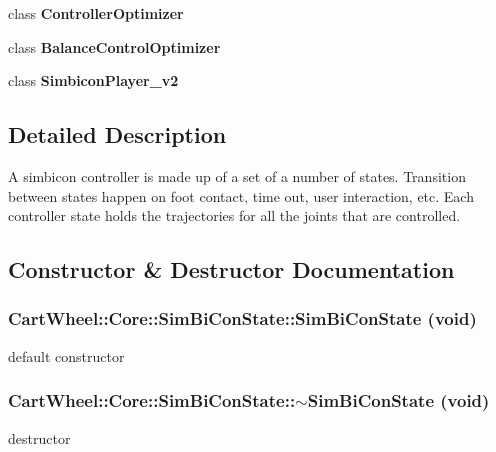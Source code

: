 \begin{DoxyCompactItemize}
\item 
\hypertarget{classCartWheel_1_1Core_1_1SimBiConState_ae8da284839040b40a9832401721dd043}{
class {\bfseries ControllerOptimizer}}
\label{classCartWheel_1_1Core_1_1SimBiConState_ae8da284839040b40a9832401721dd043}

\item 
\hypertarget{classCartWheel_1_1Core_1_1SimBiConState_a39464b3020a0cf52399c03300b8fd076}{
class {\bfseries BalanceControlOptimizer}}
\label{classCartWheel_1_1Core_1_1SimBiConState_a39464b3020a0cf52399c03300b8fd076}

\item 
\hypertarget{classCartWheel_1_1Core_1_1SimBiConState_a29b34775f8ee85729748375472b56b46}{
class {\bfseries SimbiconPlayer\_\-v2}}
\label{classCartWheel_1_1Core_1_1SimBiConState_a29b34775f8ee85729748375472b56b46}

\end{DoxyCompactItemize}


\subsection{Detailed Description}
A simbicon controller is made up of a set of a number of states. Transition between states happen on foot contact, time out, user interaction, etc. Each controller state holds the trajectories for all the joints that are controlled. 

\subsection{Constructor \& Destructor Documentation}
\hypertarget{classCartWheel_1_1Core_1_1SimBiConState_a5201e6401e9c53067b5fedaa2a457431}{
\subsubsection[{SimBiConState}]{\setlength{\rightskip}{0pt plus 5cm}CartWheel::Core::SimBiConState::SimBiConState (void)}}
\label{classCartWheel_1_1Core_1_1SimBiConState_a5201e6401e9c53067b5fedaa2a457431}
default constructor \hypertarget{classCartWheel_1_1Core_1_1SimBiConState_a4917b8eb30d919c48ff57526e8d9c3e1}{
\subsubsection[{$\sim$SimBiConState}]{\setlength{\rightskip}{0pt plus 5cm}CartWheel::Core::SimBiConState::$\sim$SimBiConState (void)}}
\label{classCartWheel_1_1Core_1_1SimBiConState_a4917b8eb30d919c48ff57526e8d9c3e1}
destructor 

